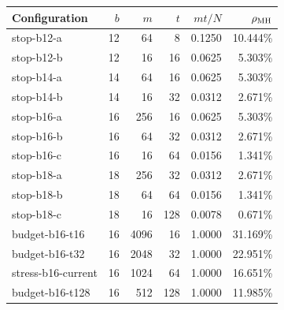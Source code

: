 \begin{tabular}{lrrrrr}
\toprule
Configuration & $b$ & $m$ & $t$ & $mt/N$ & $\rho_{\rm MH}$ \\
\midrule
stop-b12-a & 12 & 64 & 8 & 0.1250 & 10.444\% \\
stop-b12-b & 12 & 16 & 16 & 0.0625 & 5.303\% \\
stop-b14-a & 14 & 64 & 16 & 0.0625 & 5.303\% \\
stop-b14-b & 14 & 16 & 32 & 0.0312 & 2.671\% \\
stop-b16-a & 16 & 256 & 16 & 0.0625 & 5.303\% \\
stop-b16-b & 16 & 64 & 32 & 0.0312 & 2.671\% \\
stop-b16-c & 16 & 16 & 64 & 0.0156 & 1.341\% \\
stop-b18-a & 18 & 256 & 32 & 0.0312 & 2.671\% \\
stop-b18-b & 18 & 64 & 64 & 0.0156 & 1.341\% \\
stop-b18-c & 18 & 16 & 128 & 0.0078 & 0.671\% \\
budget-b16-t16 & 16 & 4096 & 16 & 1.0000 & 31.169\% \\
budget-b16-t32 & 16 & 2048 & 32 & 1.0000 & 22.951\% \\
stress-b16-current & 16 & 1024 & 64 & 1.0000 & 16.651\% \\
budget-b16-t128 & 16 & 512 & 128 & 1.0000 & 11.985\% \\
\bottomrule
\end{tabular}
